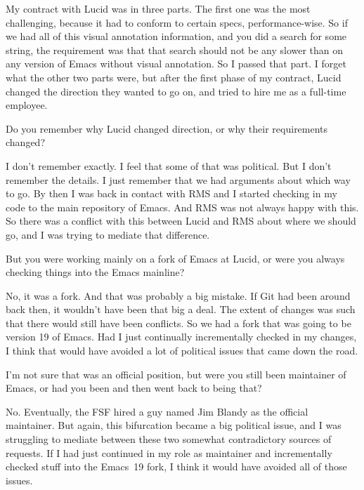 \documentclass[format=acmsmall,screen]{acmart}
\begin{document}
My contract with Lucid was in three parts.  The first one was the
most challenging, because it had to conform to certain specs,
performance-wise.  So if we had all of this visual annotation information,
and you did a search for some string, the requirement was that that
search should not be any slower than on any version of Emacs without
visual annotation.  So I passed that part.  I forget what the other
two parts were, but after the first phase of my contract, Lucid
changed the direction they wanted to go on, and tried to hire me as a
full-time employee.

\begin{question}
Do you remember why Lucid changed direction, or why their
requirements changed?
\end{question}
%
I don't remember exactly.  I feel that some of that was political.
But I don't remember the details.  I just remember that we had
arguments about which way to go.  By then I was back in contact with
RMS and I started checking in my code to the main repository of
Emacs.  And RMS was not always happy with this.  So there was a
conflict with this between Lucid and RMS about where we should go, and
I was trying to mediate that difference.

\begin{question}
But you were working mainly on a fork of Emacs at Lucid, or were
you always checking things into the Emacs mainline?
\end{question}
%
No, it was a fork.  And that was probably a big mistake.  If
Git had been around back then, it wouldn't have been that big a deal.
The extent of changes was such that there would still have been
conflicts.  So we had a fork that was going to be version 19 of
Emacs.  Had I just continually incrementally checked in my changes, I
think that would have avoided a lot of political issues that came down
the road.

\begin{question}
I'm not sure that was an official position, but were you still been
maintainer of Emacs, or had you been and then went back to being that?
\end{question}
%
No. Eventually, the FSF hired a guy named Jim Blandy as the
official maintainer.  But again, this bifurcation became a big
political issue, and I was struggling to mediate between these two
somewhat contradictory sources of requests.  If I had just continued
in my role as maintainer and incrementally checked stuff into the
Emacs~19 fork, I think it would have avoided all of those issues.
\end{document}
